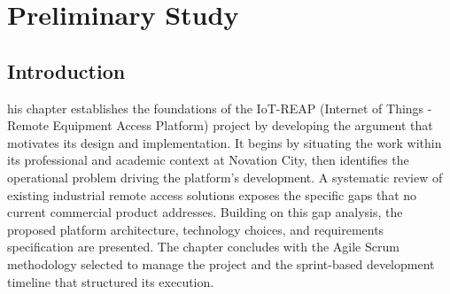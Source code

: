 %

\chapter{Preliminary Study}
\label{chap:preliminary_study}

\section*{Introduction}

his chapter establishes the foundations of the IoT-REAP
(Internet of Things - Remote Equipment Access Platform) project by
developing the argument that motivates its design and implementation. It begins
by situating the work within its professional and academic context at Novation City,
then identifies the operational problem driving the platform's development. A
systematic review of existing industrial remote access solutions exposes the specific
gaps that no current commercial product addresses. Building on this gap analysis,
the proposed platform architecture, technology choices, and requirements specification
are presented. The chapter concludes with the Agile Scrum methodology selected to
manage the project and the sprint-based development timeline that structured its
execution.

